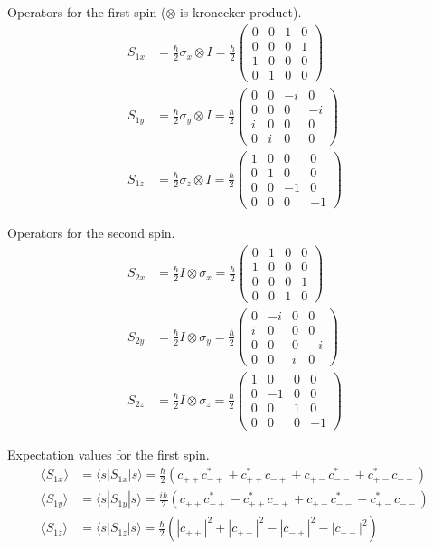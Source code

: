 Operators for the first spin ($\otimes$ is kronecker product).
\begin{align*}
S_{1x}&=\frac{\hbar}{2}\sigma_x\otimes I=\frac{\hbar}{2}
\begin{pmatrix}
0&0&1&0\\
0&0&0&1\\
1&0&0&0\\
0&1&0&0
\end{pmatrix}
\\
S_{1y}&=\frac{\hbar}{2}\sigma_y\otimes I=\frac{\hbar}{2}
\begin{pmatrix}
0&0&-i&0\\
0&0&0&-i\\
i&0&0&0\\
0&i&0&0
\end{pmatrix}
\\
S_{1z}&=\frac{\hbar}{2}\sigma_z\otimes I=\frac{\hbar}{2}
\begin{pmatrix}
1&0&0&0\\
0&1&0&0\\
0&0&-1&0\\
0&0&0&-1
\end{pmatrix}
\end{align*}

Operators for the second spin.
\begin{align*}
S_{2x}&=\frac{\hbar}{2}I\otimes\sigma_x=\frac{\hbar}{2}
\begin{pmatrix}
0&1&0&0\\
1&0&0&0\\
0&0&0&1\\
0&0&1&0
\end{pmatrix}
\\
S_{2y}&=\frac{\hbar}{2}I\otimes\sigma_y=\frac{\hbar}{2}
\begin{pmatrix}
0&-i&0&0\\
i&0&0&0\\
0&0&0&-i\\
0&0&i&0
\end{pmatrix}
\\
S_{2z}&=\frac{\hbar}{2}I\otimes\sigma_z=\frac{\hbar}{2}
\begin{pmatrix}
1&0&0&0\\
0&-1&0&0\\
0&0&1&0\\
0&0&0&-1
\end{pmatrix}
\end{align*}

Expectation values for the first spin.
\begin{align*}
\langle S_{1x}\rangle&=\langle s|S_{1x}|s\rangle
=\frac{\hbar}{2}
\left(c_{++}c_{-+}^*+c_{++}^*c_{-+}+c_{+-}c_{--}^*+c_{+-}^*c_{--}\right)
\\
\langle S_{1y}\rangle&=\langle s|S_{1y}|s\rangle
=\frac{i\hbar}{2}
\left(c_{++}c_{-+}^*-c_{++}^*c_{-+}+c_{+-}c_{--}^*-c_{+-}^*c_{--}\right)
\\
\langle S_{1z}\rangle&=\langle s|S_{1z}|s\rangle
=\frac{\hbar}{2}
\left(|c_{++}|^2+|c_{+-}|^2-|c_{-+}|^2-|c_{--}|^2\right)
\end{align*}

